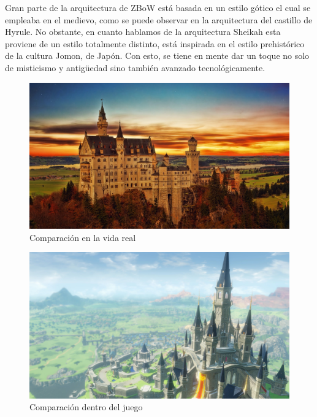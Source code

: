 \documentclass[12pt]{article}
\begin{document}
Gran parte de la arquitectura de ZBoW está basada en un estilo gótico el cual se empleaba en el medievo, como se puede observar en la arquitectura del castillo de Hyrule. No obstante, en cuanto hablamos de la arquitectura Sheikah esta proviene de un estilo totalmente distinto, está inspirada en el estilo prehistórico de la cultura Jomon, de Japón. Con esto, se tiene en mente dar un toque no solo de misticismo y antigüedad sino también avanzado tecnológicamente.

    \begin{figure}[H]
      \centering
      \includegraphics[scale=0.4]{images/general images/Arquitectura/arquitectura-gotica-imagenes.jpg}
      \caption{\small Comparación en la vida real}
    \end{figure}

        \begin{figure}[H]
      \centering
      \includegraphics[scale=0.17]{images/general images/Arquitectura/castillo hyrule.jpg}
      \caption{\small Comparación dentro del juego}
    \end{figure}
\end{document}
